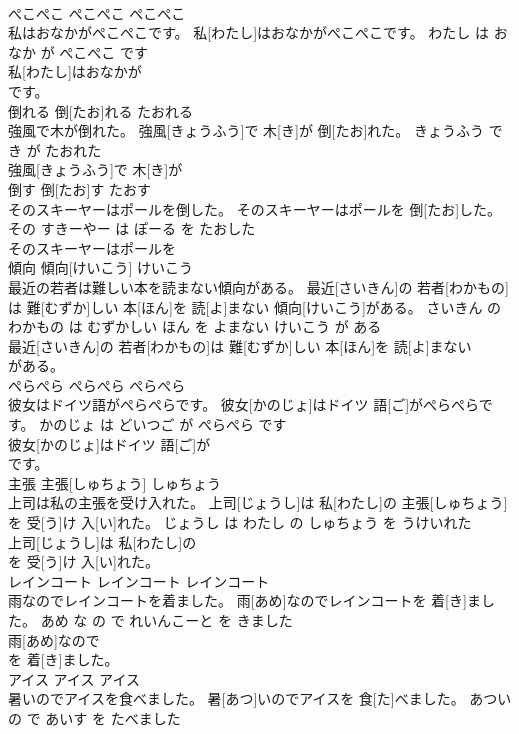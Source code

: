 \documentclass[8pt]{extreport}
\begin{document}
\begin{CJK}{UTF8}{min}
\\	ぺこぺこ	ぺこぺこ	ぺこぺこ	
\\	私はおなかがぺこぺこです。	私[わたし]はおなかがぺこぺこです。	わたし は おなか が ぺこぺこ です	
\\	私[わたし]はおなかが
\\	です。			
\\	倒れる	倒[たお]れる	たおれる	
\\	強風で木が倒れた。	強風[きょうふう]で 木[き]が 倒[たお]れた。	きょうふう で き が たおれた	
\\	強風[きょうふう]で 木[き]が
\\	倒す	倒[たお]す	たおす	
\\	そのスキーヤーはポールを倒した。	そのスキーヤーはポールを 倒[たお]した。	その すきーやー は ぽーる を たおした	
\\	そのスキーヤーはポールを
\\	傾向	傾向[けいこう]	けいこう	
\\	最近の若者は難しい本を読まない傾向がある。	最近[さいきん]の 若者[わかもの]は 難[むずか]しい 本[ほん]を 読[よ]まない 傾向[けいこう]がある。	さいきん の わかもの は むずかしい ほん を よまない けいこう が ある	
\\	最近[さいきん]の 若者[わかもの]は 難[むずか]しい 本[ほん]を 読[よ]まない
\\	がある。			
\\	ぺらぺら	ぺらぺら	ぺらぺら	
\\	彼女はドイツ語がぺらぺらです。	彼女[かのじょ]はドイツ 語[ご]がぺらぺらです。	かのじょ は どいつご が ぺらぺら です	
\\	彼女[かのじょ]はドイツ 語[ご]が
\\	です。			
\\	主張	主張[しゅちょう]	しゅちょう	
\\	上司は私の主張を受け入れた。	上司[じょうし]は 私[わたし]の 主張[しゅちょう]を 受[う]け 入[い]れた。	じょうし は わたし の しゅちょう を うけいれた	
\\	上司[じょうし]は 私[わたし]の
\\	を 受[う]け 入[い]れた。			
\\	レインコート	レインコート	レインコート	
\\	雨なのでレインコートを着ました。	雨[あめ]なのでレインコートを 着[き]ました。	あめ な の で れいんこーと を きました	
\\	雨[あめ]なので
\\	を 着[き]ました。			
\\	アイス	アイス	アイス	
\\	暑いのでアイスを食べました。	暑[あつ]いのでアイスを 食[た]べました。	あつい の で あいす を たべました	

\end{CJK}
\end{document}
